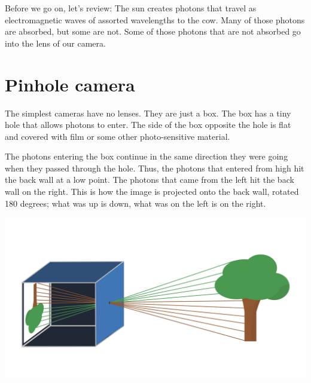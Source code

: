 Before we go on, let's review: The sun creates photons that travel as
electromagnetic waves of assorted wavelengths to the cow.  Many of
those photons are absorbed, but some are not.  Some of those photons
that are not absorbed go into the lens of our camera.

\section{Pinhole camera}

The simplest cameras have no lenses. They are just a box.  The box has
a tiny hole that allows photons to enter.  The side of the box
opposite the hole is flat and covered with film or some other
photo-sensitive material.

The photons entering the box continue in the same direction they were
going when they passed through the hole.  Thus, the photons that
entered from high hit the back wall at a low point.  The photons that came from
the left hit the back wall on the right. This is how the image is projected
onto the back wall, rotated 180 degrees; what was up is down, what was
on the left is on the right.

\includegraphics[width=1\textwidth]{pinholeCamera.png}


